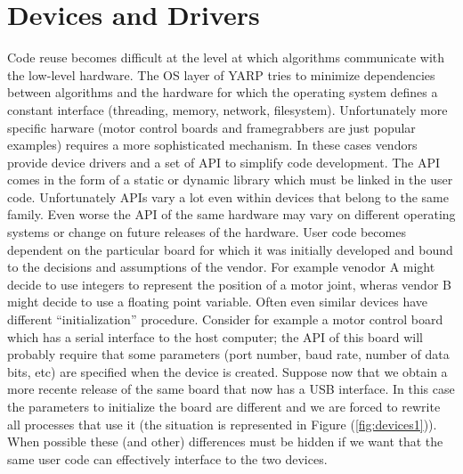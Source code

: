 \section{Devices and Drivers}

Code reuse becomes difficult at the level at which algorithms 
communicate with the low-level hardware. The OS layer of YARP tries 
to minimize dependencies between algorithms and the hardware for 
which the operating system defines a constant interface (threading, 
memory, network, filesystem). Unfortunately more specific harware 
(motor control boards and framegrabbers are just 
popular examples) requires a more sophisticated mechanism. In these 
cases vendors provide device drivers and a set of API to simplify 
code development. The API comes in the form of a static or dynamic 
library which must be linked in the user code. Unfortunately
APIs vary a lot even within devices that belong to the same family. 
Even worse the API of the same hardware may vary on different 
operating systems or change on future releases of the hardware. User 
code becomes dependent on the particular board for which it was initially 
developed and bound to the decisions and assumptions of the vendor. For 
example venodor A might decide to use integers to represent the position 
of a motor joint, wheras vendor B might decide to use a floating point
variable. Often even similar devices have different ``initialization'' 
procedure. Consider for example a motor control board which has a serial
interface to the host computer; the API of this board will probably require 
that some parameters (port number, baud rate, number of data bits, etc) are 
specified when the device is created. Suppose now that we obtain a more 
recente release of the same board that now has a USB interface. In this 
case the parameters to initialize the board are different and we are forced 
to rewrite all processes that use it (the situation is 
represented in Figure (\ref{fig:devices1})). When possible these (and other) 
differences must be hidden if we want that the same user code can 
effectively interface to the two devices.


